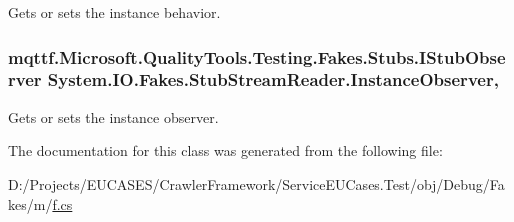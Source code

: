 Gets or sets the instance behavior.

\hypertarget{class_system_1_1_i_o_1_1_fakes_1_1_stub_stream_reader_a3704f73acbff505cc17223c801087dfb}{
\subsubsection[{Instance\-Observer}]{\setlength{\rightskip}{0pt plus 5cm}mqttf.\-Microsoft.\-Quality\-Tools.\-Testing.\-Fakes.\-Stubs.\-I\-Stub\-Observer System.\-I\-O.\-Fakes.\-Stub\-Stream\-Reader.\-Instance\-Observer\hspace{0.3cm}{\ttfamily [get]}, {\ttfamily [set]}}}\label{class_system_1_1_i_o_1_1_fakes_1_1_stub_stream_reader_a3704f73acbff505cc17223c801087dfb}


Gets or sets the instance observer.



The documentation for this class was generated from the following file\-:\begin{DoxyCompactItemize}
\item 
D\-:/\-Projects/\-E\-U\-C\-A\-S\-E\-S/\-Crawler\-Framework/\-Service\-E\-U\-Cases.\-Test/obj/\-Debug/\-Fakes/m/\hyperlink{m_2f_8cs}{f.\-cs}\end{DoxyCompactItemize}
